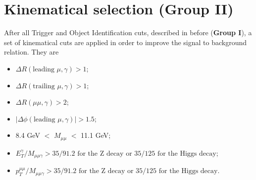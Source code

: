 
\clearpage

\section{Kinematical selection (Group II)}


After all Trigger and Object Identification cuts, described in before (\textbf{Group I}), a set of kinematical cuts are applied in order to improve the signal to background relation. They are

\begin{itemize}
  \item $\Delta R(\text{leading }\mu, \gamma) > 1$;
  \item $\Delta R(\text{trailing }\mu, \gamma) > 1$;
  \item $\Delta R(\mu\mu, \gamma) > 2$;
  \item $|\Delta \phi (\text{leading }\mu, \gamma)| > 1.5$;
  \item 8.4 GeV $<$ $M_{\mu\mu}$ $<$ 11.1 GeV;
  \item $E_{T}^{\gamma}/M_{\mu\mu\gamma} > 35/91.2 \text{ for the Z decay or } 35/125 \text{ for the Higgs decay} $;
  \item $p_{T}^{\mu\mu}/M_{\mu\mu\gamma} > 35/91.2 \text{ for the Z decay or } 35/125 \text{ for the Higgs decay} $.
\end{itemize}

